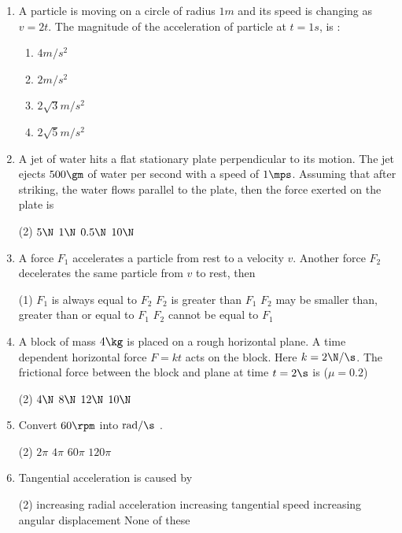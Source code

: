 \documentclass{article}
\newcommand{\ans}{\textcolor{red!95}{\textit{\quad}}}
\begin{document}
\begin{enumerate}
\item A particle is moving on a circle of radius $1 m$ and its speed is changing as $v=2t$. The magnitude of the acceleration of particle at $t=1 s$, is :
\begin{multicols}{2}
\begin{enumerate}
\item $4 m/s^2$
\item $2 m/s^2$
\item $2\sqrt{3}m/s^2$
\item $2\sqrt{5}m/s^2$
\end{enumerate}
\end{multicols}

\item A jet of water hits a flat stationary plate perpendicular to its motion. The jet ejects $500\gm$ of water per second with a speed of $1 \mps$. Assuming that after striking, the water flows parallel to the plate, then the force exerted on the plate is
\begin{tasks}(2)
	\task $5\N$
	\task $1\N$
	\task $0.5\N$\ans
	\task $10\N$
\end{tasks}

\item A force $F_1$ accelerates a particle from rest to a velocity $v$. Another force $F_2$ decelerates the same particle from $v$ to rest, then
\begin{tasks}(1)
	\task $F_1$ is always equal to $F_2$\ans
	\task $F_2$ is greater than $F_1$
	\task $F_2$ may be smaller than, greater than or equal to $F_1$
	\task $F_2$ cannot be equal to $F_1$
\end{tasks}

\item A block of mass $4 \kg$ is placed on a rough horizontal plane. A time dependent horizontal force $F = kt$ acts on the block. Here $k = 2 \N/\s$. The frictional force between the block and plane at
time $t = 2\s$ is ($\mu = 0.2$)
\begin{tasks}(2)
	\task $4\N$
	\task $8\N$\ans
	\task $12\N$
	\task $10\N$
\end{tasks}


\item Convert $60 \rpm$ into $\text{rad}/\s$ .
\begin{tasks}(2)
	\task $2\pi$\ans
	\task $4\pi$
	\task $60\pi$
	\task $120\pi$
\end{tasks}

\item Tangential acceleration is caused by 
\begin{tasks}(2)
	\task increasing radial acceleration
	\task increasing tangential speed\ans
	\task increasing angular displacement
	\task None of these
\end{tasks}


\end{enumerate}
\end{document}
